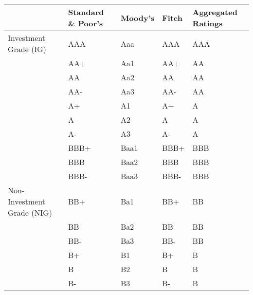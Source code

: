\begin{tabular}{lllll}
\toprule
{} & Standard \& Poor's & Moody's & Fitch & Aggregated Ratings \\
\midrule
Investment Grade (IG)      &               AAA &     Aaa &   AAA &                AAA \\
                           &               AA+ &     Aa1 &   AA+ &                 AA \\
                           &                AA &     Aa2 &    AA &                 AA \\
                           &               AA- &     Aa3 &   AA- &                 AA \\
                           &                A+ &      A1 &    A+ &                  A \\
                           &                 A &      A2 &     A &                  A \\
                           &                A- &      A3 &    A- &                  A \\
                           &              BBB+ &    Baa1 &  BBB+ &                BBB \\
                           &               BBB &    Baa2 &   BBB &                BBB \\
                           &              BBB- &    Baa3 &  BBB- &                BBB \\
Non-Investment Grade (NIG) &               BB+ &     Ba1 &   BB+ &                 BB \\
                           &                BB &     Ba2 &    BB &                 BB \\
                           &               BB- &     Ba3 &   BB- &                 BB \\
                           &                B+ &      B1 &    B+ &                  B \\
                           &                 B &      B2 &     B &                  B \\
                           &                B- &      B3 &    B- &                  B \\
\bottomrule
\end{tabular}
